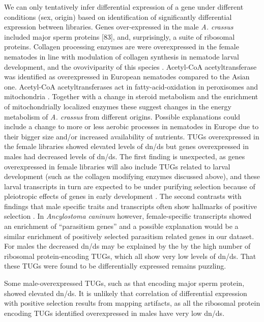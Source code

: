 \documentclass[10pt]{bmc_article}
\newenvironment{bmcformat}{\begin{raggedright}\baselineskip20pt\sloppy\setboolean{publ}{false}}{\end{raggedright}\baselineskip20pt\sloppy}
\begin{document}
\begin{bmcformat}
We can only tentatively infer differential expression of a gene under
different conditions (sex, origin) based on identification of
significantly differential expression between libraries. Genes
over-expressed in the male \textit{A. crassus} included major sperm
proteins [83], and, surprisingly, a suite of ribosomal
proteins. Collagen processing enzymes are were overexpressed in the
female nematodes in line with modulation of collagen synthesis in
nematode larval development, and the ovoviviparity of this species
\cite{pmid10637627}. Acetyl-CoA acetyltransferase was identified as
overexpressed in European nematodes compared to the Asian
one. Acetyl-CoA acetyltransferases act in fatty-acid-oxidation in
peroxisomes and mitochondria \cite{pmid4721607}. Together with a
change in steroid metabolism and the enrichment of mitochondrially
localized enzymes these suggest changes in the energy metabolism of
\textit{A. crassus} from different origins. Possible explanations
could include a change to more or less aerobic processes in nematodes
in Europe due to their bigger size and/or increased availability of
nutrients.  TUGs overexpressed in the female libraries showed elevated
levels of dn/ds but genes overexpressed in males had decreased levels
of dn/ds. The first finding is unexpected, as genes overexpressed in
female libraries will also include TUGs related to larval development
(such as the collagen modifying enzymes discussed above), and these
larval transcripts in turn are expected to be under purifying
selection because of pleiotropic effects of genes in early development
\cite{pmid15371532}. The second contrasts with findings that male
specific traits and transcripts often show hallmarks of positive
selection \cite{pmid15795858, pmid11404480}. In \textit{Ancylostoma
  caninum} however, female-specific transcripts showed an enrichment
of “parasitism genes'' \cite{pmid20470405} and a possible explanation
would be a similar enrichment of positively selected parasitism
related genes in our dataset. For males the decreased dn/ds may be
explained by the by the high number of ribosomal protein-encoding
TUGs, which all show very low levels of dn/ds. That these TUGs were
found to be differentially expressed remains puzzling.

Some male-overexpressed TUGs, such as that encoding major sperm
protein, showed elevated dn/ds. It is unlikely that correlation of
differential expression with positive selection results from mapping
artifacts, as all the ribosomal protein encoding TUGs identified
overexpressed in males have very low dn/ds.


\end{bmcformat}
\end{document}
